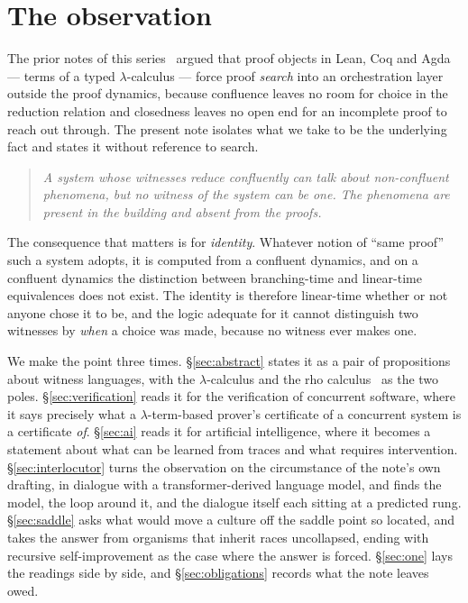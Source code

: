 \documentclass[11pt]{article}
\theoremstyle{plain}
\theoremstyle{definition}
\theoremstyle{remark}
\begin{document}
\section{The observation}

The prior notes of this series~\cite{ProofSearch,PaPContinued} argued that
proof objects in Lean, Coq and Agda --- terms of a typed $\lambda$-calculus ---
force proof \emph{search} into an orchestration layer outside the proof
dynamics, because confluence leaves no room for choice in the reduction
relation and closedness leaves no open end for an incomplete proof to reach
out through. The present note isolates what we take to be the underlying fact
and states it without reference to search.

\begin{quote}
\itshape A system whose witnesses reduce confluently can talk about
non-confluent phenomena, but no witness of the system can be one. The
phenomena are present in the building and absent from the proofs.
\end{quote}

The consequence that matters is for \emph{identity}. Whatever notion of
``same proof'' such a system adopts, it is computed from a confluent
dynamics, and on a confluent dynamics the distinction between branching-time
and linear-time equivalences does not exist. The identity is therefore
linear-time whether or not anyone chose it to be, and the logic adequate for
it cannot distinguish two witnesses by \emph{when} a choice was made, because
no witness ever makes one.

We make the point three times. \S\ref{sec:abstract} states it as a pair of
propositions about witness languages, with the $\lambda$-calculus and the rho
calculus~\cite{MeredithRadestock05} as the two poles. \S\ref{sec:verification}
reads it for the verification of concurrent software, where it says precisely
what a $\lambda$-term-based prover's certificate of a concurrent system is a
certificate \emph{of}. \S\ref{sec:ai} reads it for artificial intelligence,
where it becomes a statement about what can be learned from traces and what
requires intervention. \S\ref{sec:interlocutor} turns the observation on the
circumstance of the note's own drafting, in dialogue with a transformer-derived
language model, and finds the model, the loop around it, and the dialogue
itself each sitting at a predicted rung. \S\ref{sec:saddle} asks what would
move a culture off the saddle point so located, and takes the answer from
organisms that inherit races uncollapsed, ending with recursive
self-improvement as the case where the answer is forced. \S\ref{sec:one} lays
the readings side by side, and \S\ref{sec:obligations} records what the note
leaves owed.
\end{document}
